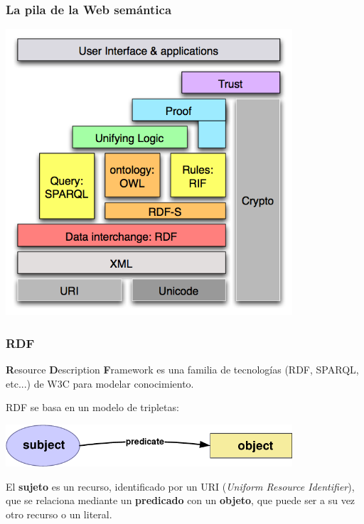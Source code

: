 \documentclass[spanish,notes=hide]{beamer}
\begin{document}
{
  \frametitle{La pila de la Web semántica}

  \begin{center}
    \includegraphics[width=0.8\textwidth]{images/semantic-web-stack.png}
  \end{center}

}
\frame
{
  \frametitle{RDF}

  \begin{Large}
     \textbf{R}esource \textbf{D}escription \textbf{F}ramework es una familia de
     tecnologías (RDF, SPARQL, etc...) de W3C para modelar conocimiento. 
  \end{Large}

  \vspace{0.7cm}

  \begin{Large}
     RDF se basa en un modelo de tripletas:
     \begin{center}
       \includegraphics[width=0.8\textwidth]{images/triple.png}
     \end{center}
     El \textbf{sujeto} es un recurso, identificado por un URI 
     (\textit{Uniform Resource Identifier}), que se relaciona mediante un 
     \textbf{predicado} con un \textbf{objeto}, que puede ser a su vez otro 
     recurso o un literal.
  \end{Large}
}
\frame
\end{document}
